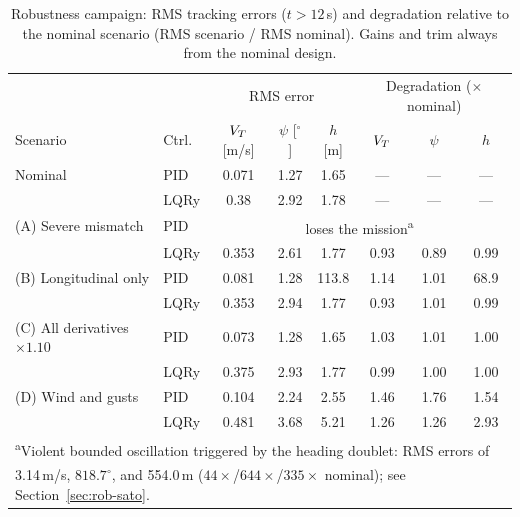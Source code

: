 \begin{table}[!t]
\caption{Robustness campaign: RMS tracking errors ($t>12$\,s) and
degradation relative to the nominal scenario (RMS scenario / RMS nominal).
Gains and trim always from the nominal design.}
\label{tab:robustness}
\centering
\begin{tabular}{llcccccc}
\toprule
 & & \multicolumn{3}{c}{RMS error} & \multicolumn{3}{c}{Degradation ($\times$ nominal)} \\
Scenario & Ctrl. & $V_T$ [m/s] & $\psi$ [$^\circ$] & $h$ [m] & $V_T$ & $\psi$ & $h$ \\
\midrule
Nominal & PID & 0.071 & 1.27 & 1.65 & --- & --- & --- \\
 & LQRy & 0.38 & 2.92 & 1.78 & --- & --- & --- \\
\addlinespace
(A) Severe mismatch & PID & \multicolumn{6}{c}{loses the mission\textsuperscript{a}} \\
 & LQRy & 0.353 & 2.61 & 1.77 & 0.93 & 0.89 & 0.99 \\
\addlinespace
(B) Longitudinal only & PID & 0.081 & 1.28 & 113.8 & 1.14 & 1.01 & 68.9 \\
 & LQRy & 0.353 & 2.94 & 1.77 & 0.93 & 1.01 & 0.99 \\
\addlinespace
(C) All derivatives $\times1.10$ & PID & 0.073 & 1.28 & 1.65 & 1.03 & 1.01 & 1.00 \\
 & LQRy & 0.375 & 2.93 & 1.77 & 0.99 & 1.00 & 1.00 \\
\addlinespace
(D) Wind and gusts & PID & 0.104 & 2.24 & 2.55 & 1.46 & 1.76 & 1.54 \\
 & LQRy & 0.481 & 3.68 & 5.21 & 1.26 & 1.26 & 2.93 \\
\bottomrule
\multicolumn{8}{l}{\footnotesize\textsuperscript{a}Violent bounded
oscillation triggered by the heading doublet: RMS errors of}\\
\multicolumn{8}{l}{\footnotesize\phantom{\textsuperscript{a}}3.14\,m/s,
$818.7^\circ$, and 554.0\,m ($44\times$/$644\times$/$335\times$
nominal); see Section~\ref{sec:rob-sato}.}
\end{tabular}
\end{table}

